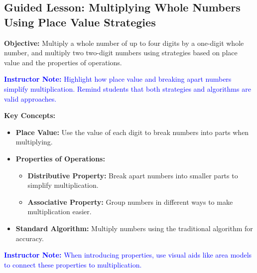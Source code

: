 \documentclass[12pt]{article}
\title{}
\date{}
\begin{document}
\subsection*{Guided Lesson: Multiplying Whole Numbers Using Place Value Strategies}
\onehalfspacing

\begin{tcolorbox}[colframe=black!40, colback=gray!5, 
coltitle=black, colbacktitle=black!20, fonttitle=\bfseries\Large, 
title=Learning Objective, halign title=center, left=5pt, right=5pt, top=5pt, bottom=15pt]
\textbf{Objective:} Multiply a whole number of up to four digits by a one-digit whole number, and multiply two two-digit numbers using strategies based on place value and the properties of operations.

\textcolor{blue}{\textbf{Instructor Note:} Highlight how place value and breaking apart numbers simplify multiplication. Remind students that both strategies and algorithms are valid approaches.}
\end{tcolorbox}

\vspace{1em}

\begin{tcolorbox}[colframe=black!60, colback=white, 
coltitle=black, colbacktitle=black!15, fonttitle=\bfseries\Large, 
title=Key Concepts and Vocabulary, halign title=center, left=10pt, right=10pt, top=10pt, bottom=15pt]
\textbf{Key Concepts:}
\begin{itemize}
    \item \textbf{Place Value:} Use the value of each digit to break numbers into parts when multiplying.
    \item \textbf{Properties of Operations:}
    \begin{itemize}
        \item \textbf{Distributive Property:} Break apart numbers into smaller parts to simplify multiplication.
        \item \textbf{Associative Property:} Group numbers in different ways to make multiplication easier.
    \end{itemize}
    \item \textbf{Standard Algorithm:} Multiply numbers using the traditional algorithm for accuracy.
\end{itemize}

\textcolor{blue}{\textbf{Instructor Note:} When introducing properties, use visual aids like area models to connect these properties to multiplication.}
\end{tcolorbox}
\end{document}
